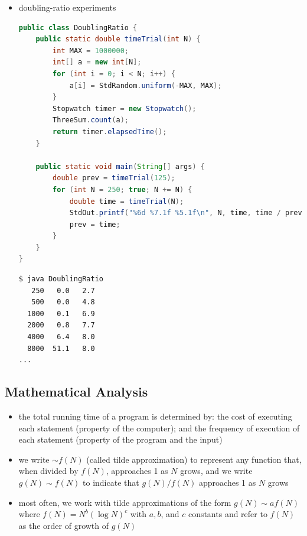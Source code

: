 \documentclass[8pt,a4paper,compress]{beamer}
\begin{document}
\begin{frame}[fragile]
\begin{itemize}
\item doubling-ratio experiments
\begin{lstlisting}[language=Java]
public class DoublingRatio {
    public static double timeTrial(int N) {
        int MAX = 1000000;
        int[] a = new int[N];
        for (int i = 0; i < N; i++) {
            a[i] = StdRandom.uniform(-MAX, MAX);
        }
        Stopwatch timer = new Stopwatch();
        ThreeSum.count(a);
        return timer.elapsedTime();
    }

    public static void main(String[] args) { 
        double prev = timeTrial(125);
        for (int N = 250; true; N += N) {
            double time = timeTrial(N);
            StdOut.printf("%6d %7.1f %5.1f\n", N, time, time / prev);
            prev = time;
        } 
    } 
} 
\end{lstlisting}

\begin{lstlisting}[language={}]
$ java DoublingRatio
   250   0.0   2.7
   500   0.0   4.8
  1000   0.1   6.9
  2000   0.8   7.7
  4000   6.4   8.0
  8000  51.1   8.0
...
\end{lstlisting}
\end{itemize}
\end{frame}

\subsection*{Mathematical Analysis}
\begin{frame}[fragile]
\begin{itemize}
\item the total running time of a program is determined by: the cost of executing each statement (property of the computer); and the frequency of execution of each statement (property of the program and the input)

\item we write $\sim f(N)$ (called tilde approximation) to represent any function that, when divided by $f(N)$, approaches 1 as $N$ grows, and we write $g(N)\sim f(N)$ to indicate that $g(N)/f(N)$ approaches 1 as $N$ grows

\item most often, we work with tilde approximations of the form $g(N)\sim af(N)$ where $f(N)=N^b(\log N)^c$ with $a, b$, and $c$ constants and refer to $f(N)$ as the order of growth of $g(N)$
\end{itemize}
\end{frame}
\end{document}
